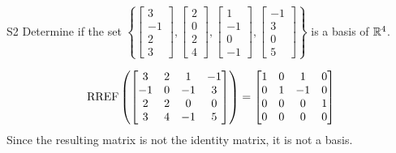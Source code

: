 \begin{problem}{S2}
  Determine if the set \(\left\{
    \begin{bmatrix} 3 \\ -1 \\ 2 \\3 \end{bmatrix},
    \begin{bmatrix} 2 \\ 0 \\ 2 \\ 4\end{bmatrix},
    \begin{bmatrix} 1 \\ -1 \\ 0 \\ -1\end{bmatrix},
    \begin{bmatrix} -1 \\ 3 \\ 0 \\ 5\end{bmatrix}
  \right\}\) is a basis of \(\mathbb{R}^4\).
\end{problem}
\begin{solution}
  \[\operatorname{RREF}\left(
    \begin{bmatrix}
      3 & 2 & 1 & -1\\
      -1 & 0 & -1 & 3\\
      2 & 2 & 0 & 0\\
      3 & 4 & -1 & 5\\
    \end{bmatrix} \right)= \begin{bmatrix}
      1 & 0 & 1 & 0 \\
      0 & 1 & -1 & 0 \\
      0 & 0 & 0 & 1 \\
      0 & 0 & 0 & 0
    \end{bmatrix}
  \]
Since the resulting matrix is not the identity matrix, it is not a basis.
\end{solution}


